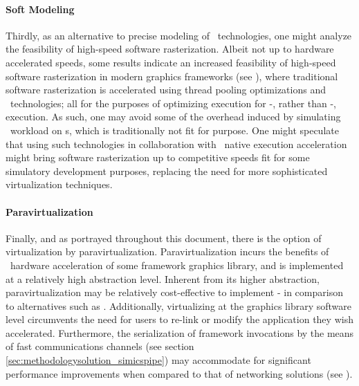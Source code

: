 \paragraph{Soft Modeling}
\label{par:background_graphicsvirtualization_softmodeling}
Thirdly, as an alternative to precise modeling of \dvttermgpu\ technologies, one might analyze the feasibility of high-speed software rasterization.
Albeit not up to hardware accelerated speeds, some results indicate an increased feasibility of high-speed software rasterization in modern graphics frameworks (see ), where traditional software rasterization is accelerated using thread pooling optimizations and \dvttermsimd\ technologies; all for the purposes of optimizing execution for \dvttermcpu -, rather than \dvttermgpu -, execution.
As such, one may avoid some of the overhead induced by simulating \dvttermgpu\ workload on \dvttermcpu s, which is traditionally not fit for purpose.
One might speculate that using such technologies in collaboration with \dvttermhost\ native execution acceleration might bring software rasterization up to competitive speeds fit for some simulatory development purposes, replacing the need for more sophisticated virtualization techniques.

\paragraph{Paravirtualization}
\label{par:background_graphicsvirtualization_paravirtualization}
Finally, and as portrayed throughout this document, there is the option of virtualization by paravirtualization.
Paravirtualization incurs the benefits of \dvttermhost\ hardware acceleration of some framework graphics library, and is implemented at a relatively high abstraction level. %
Inherent from its higher abstraction, paravirtualization may be relatively cost-effective to implement - in comparison to alternatives such as .
Additionally, virtualizing at the graphics library software level circumvents the need for users to re-link or modify the application they wish accelerated.
Furthermore, the serialization of framework invocations by the means of fast communications channels (see section \ref{sec:methodologysolution_simicspipe}) may accommodate for significant performance improvements when compared to that of networking solutions (see ).

